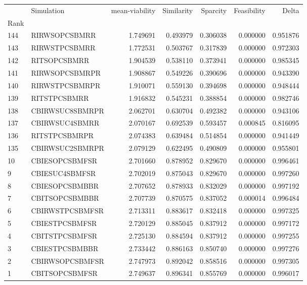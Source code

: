 \begin{tabular}{llrrrrr}
 & Simulation & mean-viability & Similarity & Sparcity & Feasibility & Delta \\
Rank &  &  &  &  &  &  \\
144 & RI\-RWS\-OPC\-SBM\-RR & 1.749691 & 0.493979 & 0.306038 & 0.000000 & 0.951876 \\
143 & RI\-RWS\-TPC\-SBM\-RR & 1.772531 & 0.503767 & 0.317839 & 0.000000 & 0.972303 \\
142 & RI\-TS\-OPC\-SBM\-RR & 1.904539 & 0.538110 & 0.373941 & 0.000000 & 0.985345 \\
141 & RI\-RWS\-OPC\-SBM\-RPR & 1.908867 & 0.549226 & 0.390696 & 0.000000 & 0.943390 \\
140 & RI\-RWS\-TPC\-SBM\-RPR & 1.910071 & 0.559130 & 0.394698 & 0.000000 & 0.948444 \\
139 & RI\-TS\-TPC\-SBM\-RR & 1.916832 & 0.545231 & 0.388854 & 0.000000 & 0.982746 \\
138 & CBI\-RWS\-UC8\-SBM\-RPR & 2.062701 & 0.630704 & 0.492382 & 0.000000 & 0.943106 \\
137 & CBI\-RWS\-UC4\-SBM\-RR & 2.070167 & 0.692539 & 0.593457 & 0.000845 & 0.816095 \\
136 & RI\-TS\-TPC\-SBM\-RPR & 2.074383 & 0.639484 & 0.514854 & 0.000000 & 0.941449 \\
135 & CBI\-RWS\-UC2\-SBM\-RPR & 2.079129 & 0.622495 & 0.490809 & 0.000000 & 0.955801 \\
10 & CBI\-ES\-OPC\-SBM\-FSR & 2.701660 & 0.878952 & 0.829670 & 0.000000 & 0.996461 \\
9 & CBI\-ES\-UC4\-SBM\-FSR & 2.702019 & 0.875043 & 0.829670 & 0.000000 & 0.997260 \\
8 & CBI\-ES\-OPC\-SBM\-BBR & 2.707652 & 0.878933 & 0.832029 & 0.000000 & 0.997192 \\
7 & CBI\-TS\-OPC\-SBM\-BBR & 2.707739 & 0.870575 & 0.837052 & 0.000014 & 0.996484 \\
6 & CBI\-RWS\-TPC\-SBM\-FSR & 2.713311 & 0.883617 & 0.832418 & 0.000000 & 0.997325 \\
5 & CBI\-ES\-TPC\-SBM\-FSR & 2.720129 & 0.885045 & 0.837912 & 0.000000 & 0.997172 \\
4 & CBI\-TS\-TPC\-SBM\-FSR & 2.725130 & 0.884594 & 0.837912 & 0.000000 & 0.997255 \\
3 & CBI\-ES\-TPC\-SBM\-BBR & 2.733442 & 0.886163 & 0.850740 & 0.000000 & 0.997276 \\
2 & CBI\-RWS\-OPC\-SBM\-FSR & 2.747973 & 0.892042 & 0.858516 & 0.000000 & 0.997305 \\
1 & CBI\-TS\-OPC\-SBM\-FSR & 2.749637 & 0.896341 & 0.855769 & 0.000000 & 0.996017 \\
\end{tabular}
